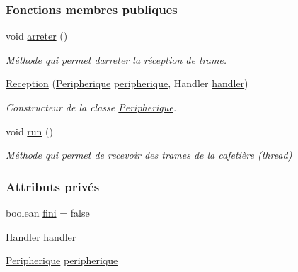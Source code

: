 \subsubsection*{Fonctions membres publiques}
\begin{DoxyCompactItemize}
\item 
void \hyperlink{classcom_1_1example_1_1ekawa_1_1_reception_a844c65410aaeee936f6b0d44f9df56db}{arreter} ()
\begin{DoxyCompactList}\small\item\em Méthode qui permet d\textquotesingle{}arreter la réception de trame. \end{DoxyCompactList}\item 
\hyperlink{classcom_1_1example_1_1ekawa_1_1_reception_a82ddcbf05814957889ace3961d8cfde6}{Reception} (\hyperlink{classcom_1_1example_1_1ekawa_1_1_peripherique}{Peripherique} \hyperlink{classcom_1_1example_1_1ekawa_1_1_reception_a9f41511c4449d90da78017ca698367ef}{peripherique}, Handler \hyperlink{classcom_1_1example_1_1ekawa_1_1_reception_ab6273fbebb5aca17b9f95e275f1d3d38}{handler})
\begin{DoxyCompactList}\small\item\em Constructeur de la classe \hyperlink{classcom_1_1example_1_1ekawa_1_1_peripherique}{Peripherique}. \end{DoxyCompactList}\item 
void \hyperlink{classcom_1_1example_1_1ekawa_1_1_reception_ae5731cf974df539d32bfaded7b29d3c0}{run} ()
\begin{DoxyCompactList}\small\item\em Méthode qui permet de recevoir des trames de la cafetière (thread) \end{DoxyCompactList}\end{DoxyCompactItemize}
\subsubsection*{Attributs privés}
\begin{DoxyCompactItemize}
\item 
boolean \hyperlink{classcom_1_1example_1_1ekawa_1_1_reception_a10e50f0a5152056cf0c79c53bfa01cc9}{fini} = false
\item 
Handler \hyperlink{classcom_1_1example_1_1ekawa_1_1_reception_ab6273fbebb5aca17b9f95e275f1d3d38}{handler}
\item 
\hyperlink{classcom_1_1example_1_1ekawa_1_1_peripherique}{Peripherique} \hyperlink{classcom_1_1example_1_1ekawa_1_1_reception_a9f41511c4449d90da78017ca698367ef}{peripherique}
\end{DoxyCompactItemize}
